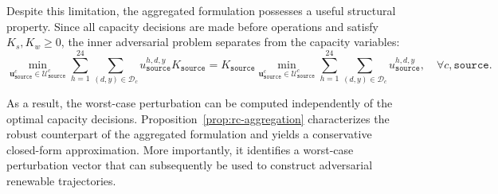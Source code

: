 \documentclass[11pt, letter]{article}
\begin{document}
Despite this limitation, the aggregated formulation possesses a useful structural property. Since all capacity decisions are made before operations and satisfy $K_s,K_w \ge 0$, the inner adversarial problem separates from the capacity variables:
\begin{equation}\label{eq:rearrange}
    \min_{{\boldsymbol{u}}^{c}_\texttt{source} \in \mathcal{U}_\texttt{source}^{c}}
    \sum_{h=1}^{24}\sum_{(d,y)\in\mathcal{D}_c}
    u_\texttt{source}^{h,d,y} K_\texttt{source}
    =
    K_\texttt{source}
    \min_{\boldsymbol{u}^{c}_\texttt{source}\in\mathcal{U}_\texttt{source}^{c}}
    \sum_{h=1}^{24}\sum_{(d,y)\in\mathcal{D}_c}
    u_\texttt{source}^{h,d,y},
    \quad \forall c,\texttt{source}.
\end{equation}

As a result, the worst-case perturbation can be computed independently of the optimal capacity decisions. Proposition~\ref{prop:rc-aggregation} characterizes the robust counterpart of the aggregated formulation and yields a conservative closed-form approximation. More importantly, it identifies a worst-case perturbation vector that can subsequently be used to construct adversarial renewable trajectories.
\end{document}
